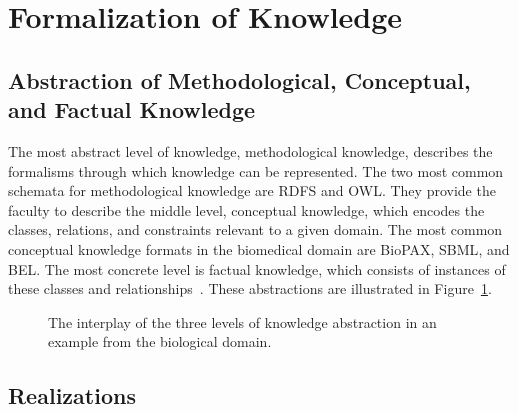 \section{Formalization of Knowledge}

\subsection{Abstraction of Methodological, Conceptual, and Factual Knowledge}

The most abstract level of knowledge, methodological knowledge, describes the formalisms through which knowledge can be represented.
The two most common schemata for methodological knowledge are \ac{RDFS} and \ac{OWL}.
They provide the faculty to describe the middle level, conceptual knowledge, which encodes the classes, relations, and constraints relevant to a given domain.
The most common conceptual knowledge formats in the biomedical domain are \ac{BioPAX}, \ac{SBML}, and \ac{BEL}.
The most concrete level is factual knowledge, which consists of instances of these classes and relationships~\cite{Marchetti2008}.
These abstractions are illustrated in Figure~\ref{fig:knowledge_types}.

\begin{figure}
    \captionsetup{format=plain}
    \caption[Levels of Knowledge Abstraction]{The interplay of the three levels of knowledge abstraction in an example from the biological domain.}
    \label{fig:knowledge_types}
\end{figure}

\subsection{Realizations}

